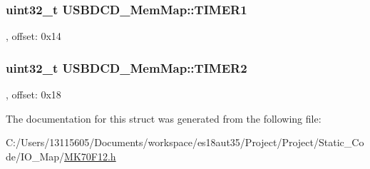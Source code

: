 \subsubsection[{T\+I\+M\+E\+R1}]{\setlength{\rightskip}{0pt plus 5cm}uint32\+\_\+t U\+S\+B\+D\+C\+D\+\_\+\+Mem\+Map\+::\+T\+I\+M\+E\+R1}\label{struct_u_s_b_d_c_d___mem_map_aa8bcdbeba3cbd7a27281d317ba5484e9}
, offset\+: 0x14 \hypertarget{struct_u_s_b_d_c_d___mem_map_abaa84a33ed5173cf08f87f3590a3f035}{}
\subsubsection[{T\+I\+M\+E\+R2}]{\setlength{\rightskip}{0pt plus 5cm}uint32\+\_\+t U\+S\+B\+D\+C\+D\+\_\+\+Mem\+Map\+::\+T\+I\+M\+E\+R2}\label{struct_u_s_b_d_c_d___mem_map_abaa84a33ed5173cf08f87f3590a3f035}
, offset\+: 0x18 

The documentation for this struct was generated from the following file\+:\begin{DoxyCompactItemize}
\item 
C\+:/\+Users/13115605/\+Documents/workspace/es18aut35/\+Project/\+Project/\+Static\+\_\+\+Code/\+I\+O\+\_\+\+Map/\hyperlink{_m_k70_f12_8h}{M\+K70\+F12.\+h}\end{DoxyCompactItemize}
